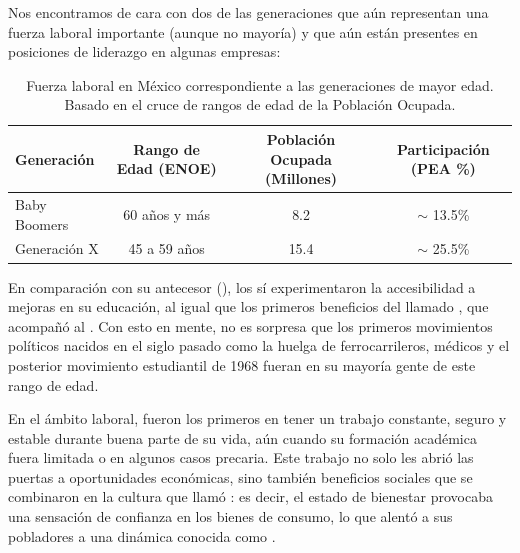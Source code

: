 Nos encontramos de cara con dos de las generaciones que aún representan una fuerza laboral importante (aunque no mayoría)
y que aún están presentes en posiciones de liderazgo en algunas empresas:
\begin{table}[H]
    \centering
    \caption[Participación laboral: Baby Boomers y Generación X]{
    Fuerza laboral en México correspondiente a las generaciones de mayor edad.
    Basado en el cruce de rangos de edad de la Población Ocupada.}
    \label{tab:boomers_genx}
    \fontsize{9.5pt}{11.5pt}\selectfont
    \begin{tabular}{|l|c|c|c|}
        \hline
        \textbf{Generación} & \textbf{Rango de Edad (ENOE)} & \textbf{Población Ocupada (Millones)} & \textbf{Participación (PEA \%)} \\
        \hline
        Baby Boomers & 60 años y más & 8.2 & $\sim$ 13.5\% \\
        \hline
        Generación X & 45 a 59 años & 15.4 & $\sim$ 25.5\% \\
        \hline
    \end{tabular}
    \vspace{1ex}
\end{table}

En comparación con su antecesor (), los  sí experimentaron
la accesibilidad a mejoras en su educación, al igual que los primeros beneficios del llamado
, que acompañó al . Con esto en mente, no es sorpresa
que los primeros movimientos políticos nacidos en el siglo pasado como la huelga de ferrocarrileros, médicos y
el posterior movimiento estudiantil de 1968 fueran en su mayoría gente de este rango de edad.

En el ámbito laboral, fueron los primeros en tener un trabajo constante, seguro y estable durante buena parte de su
vida, aún cuando su formación académica fuera limitada o en algunos casos precaria. Este trabajo no solo les abrió
las puertas a oportunidades económicas, sino también beneficios sociales que se combinaron en la cultura que
\cite{bauman_globalizacion_1999} llamó : es decir, el estado de bienestar provocaba
una sensación de confianza en los bienes de consumo, lo que alentó a sus pobladores a una dinámica conocida como
.

